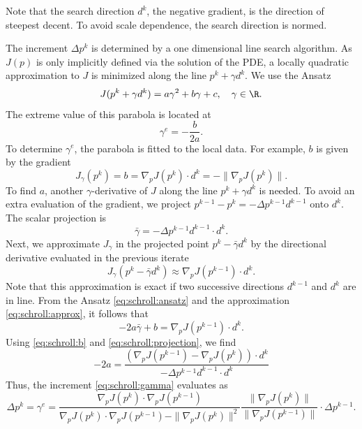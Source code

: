 Note that the search direction $d^k$, the negative gradient, is the
direction of steepest decent.  To avoid scale dependence, the search
direction is normed.

The increment $\Delta p^k$ is determined by a one dimensional line
search algorithm.  As $J(p)$ is only implicitly defined via the
solution of the PDE, a locally quadratic approximation to $J$ is
minimized along the line $p^k + \gamma d^k$.  We use the Ansatz
\begin{equation}\label{eq:schroll:ansatz}
 J(p^k + \gamma d^k) = a \gamma^2 + b \gamma + c, \quad \gamma \in \R.
\end{equation}
The extreme value of this parabola is located at
\begin{equation} \label{eq:schroll:gamma}
 \gamma^e = - \frac{b}{2a}.
\end{equation}
To determine $\gamma^e$, the parabola is fitted to the local data.
For example, $b$ is given by the gradient
\begin{equation}\label{eq:schroll:b}
 J_\gamma(p^k) = b = \nabla_p J(p^k) \cdot d^k = - \| \nabla_p J(p^k) \| .
\end{equation}
To find $a$, another $\gamma$-derivative of $J$ along the line $p^k
+ \gamma d^k$ is needed.  To avoid an extra evaluation of the
gradient, we project $p^{k-1}-p^{k}=-\Delta p^{k-1}d^{k-1}$ onto
$d^{k}$.  The scalar projection is
\begin{equation}\label{eq:schroll:projection}
 \bar\gamma = -\Delta p^{k-1} d^{k-1} \cdot d^k .
\end{equation}
Next, we approximate $J_\gamma$ in the projected point $p^k-\bar\gamma d^k$
by the directional derivative evaluated in the previous iterate
\begin{equation} \label{eq:schroll:approx}
 J_\gamma(p^k-\bar\gamma d^k) \approx \nabla_p J(p^{k-1}) \cdot d^k .
\end{equation}
Note that this approximation is exact
if two successive directions $d^{k-1}$ and $d^k$ are in line.
From the Ansatz \eqref{eq:schroll:ansatz} and the approximation
\eqref{eq:schroll:approx}, it follows that
\begin{equation}
 -2a \bar\gamma +b = \nabla_p J(p^{k-1}) \cdot d^k .
\end{equation}
Using \eqref{eq:schroll:b} and \eqref{eq:schroll:projection}, we find
\begin{equation}
 -2 a =
 \frac{(\nabla_p J(p^{k-1}) - \nabla_p J(p^k))\cdot d^k}
      {-\Delta p^{k-1} d^{k-1} \cdot d^k}
\end{equation}
Thus, the increment \eqref{eq:schroll:gamma} evaluates as
\begin{equation}
 \Delta p^k = \gamma^e =
 \frac{\nabla_p J(p^k)\cdot \nabla_p J(p^{k-1})}
      {\nabla_p J(p^k)\cdot \nabla_p J(p^{k-1}) - \|\nabla_p J(p^k)\|^2}
 \frac{\|\nabla_p J(p^k)\|}{\|\nabla_p J(p^{k-1})\|} \cdot
 \Delta p^{k-1} .
\end{equation}

